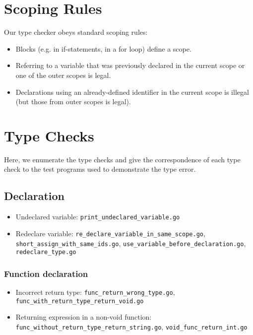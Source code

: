 \documentclass{article}
\begin{document}
\section{Scoping Rules}

Our type checker obeys standard scoping rules:

\begin{itemize}
    \item Blocks (e.g. in if-statements, in a for loop) define a scope.
    \item Referring to a variable that was previously declared in the current scope or one of the outer scopes is legal.
    \item Declarations using an already-defined identifier in the current scope is illegal (but those from outer scopes is legal).
\end{itemize}

\section{Type Checks}

Here, we enumerate the type checks and give the correspondence of each type check to the test programs used to demonstrate the type error.

\subsection{Declaration}

\begin{itemize}
\item Undeclared variable: \texttt{print\_undeclared\_variable.go}
\item Redeclare variable: \texttt{re\_declare\_variable\_in\_same\_scope.go}, \texttt{short\_assign\_with\_same\_ids.go}, \texttt{use\_variable\_before\_declaration.go}, \texttt{redeclare\_type.go}
\end{itemize}

\subsubsection{Function declaration}

\begin{itemize}
\item Incorrect return type: \texttt{func\_return\_wrong\_type.go}, \texttt{func\_with\_return\_type\_return\_void.go}
\item Returning expression in a non-void function: \texttt{func\_without\_return\_type\_return\_string.go}, \texttt{void\_func\_return\_int.go}
\end{itemize}
\end{document}
